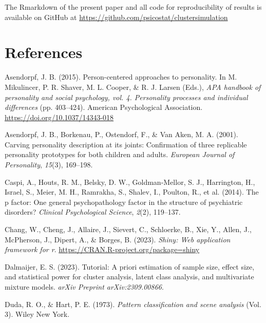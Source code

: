 \documentclass[
  man,floatsintext]{apa7}
\newlength{\cslhangindent}
\newlength{\cslentryspacingunit} %
\newenvironment{CSLReferences}[2] %
 {%
  \setlength{\parindent}{0pt}
  \ifodd #1
  \let\oldpar\par
  \def\par{\hangindent=\cslhangindent\oldpar}
  \fi
  \setlength{\parskip}{#2\cslentryspacingunit}
 }%
 {}
\begin{document}
The Rmarkdown of the present paper and all code for reproducibility of results is available on GitHub at \url{https://github.com/psicostat/clustersimulation}

\newpage

\hypertarget{references}{%
\section{References}\label{references}}

\hypertarget{refs}{}
\begin{CSLReferences}{1}{0}
\leavevmode{}%
Asendorpf, J. B. (2015). Person-centered approaches to personality. In M. Mikulincer, P. R. Shaver, M. L. Cooper, \& R. J. Larsen (Eds.), \emph{APA handbook of personality and social psychology, vol. 4. Personality processes and individual differences} (pp. 403--424). American Psychological Association. \url{https://doi.org/10.1037/14343-018}

\leavevmode{}%
Asendorpf, J. B., Borkenau, P., Ostendorf, F., \& Van Aken, M. A. (2001). Carving personality description at its joints: Confirmation of three replicable personality prototypes for both children and adults. \emph{European Journal of Personality}, \emph{15}(3), 169--198.

\leavevmode{}%
Caspi, A., Houts, R. M., Belsky, D. W., Goldman-Mellor, S. J., Harrington, H., Israel, S., Meier, M. H., Ramrakha, S., Shalev, I., Poulton, R., et al. (2014). The p factor: One general psychopathology factor in the structure of psychiatric disorders? \emph{Clinical Psychological Science}, \emph{2}(2), 119--137.

\leavevmode{}%
Chang, W., Cheng, J., Allaire, J., Sievert, C., Schloerke, B., Xie, Y., Allen, J., McPherson, J., Dipert, A., \& Borges, B. (2023). \emph{Shiny: Web application framework for r}. \url{https://CRAN.R-project.org/package=shiny}

\leavevmode{}%
Dalmaijer, E. S. (2023). Tutorial: A priori estimation of sample size, effect size, and statistical power for cluster analysis, latent class analysis, and multivariate mixture models. \emph{arXiv Preprint arXiv:2309.00866}.

\leavevmode{}%
Duda, R. O., \& Hart, P. E. (1973). \emph{Pattern classification and scene analysis} (Vol. 3). Wiley New York.


\end{CSLReferences}
\end{document}
